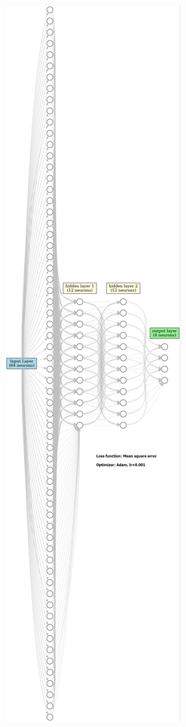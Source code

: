 \documentclass{article}
\begin{document}
\begin{figure}[h]
    \centering
    \includegraphics[height=\textheight]{NN_architecture2.png}
    \label{fig:nn_architecture}
\end{figure}
\clearpage
\end{document}
